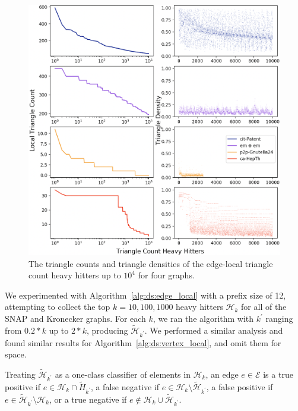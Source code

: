 \documentclass{vldb}
\begin{document}
\begin{figure}[t]
\centering
\includegraphics[width=0.9\columnwidth]{hh_comp_4}
\caption{The triangle counts and triangle densities of the edge-local triangle count heavy hitters up to $10^4$ for four graphs.
}
\label{fig:hh_comp}
\end{figure}


We experimented with Algorithm~\ref{alg:ds:edge_local} with a prefix size of 12, attempting to collect the top $k = 10, 100, 1000$ heavy hitters $\mathcal{H}_k$ for all of the SNAP and Kronecker graphs.
For each $k$, we ran the algorithm with $k^\prime$ ranging from $0.2 * k$ up to $2 * k$, producing $\widetilde{\mathcal{H}}_{k^\prime}$.
We performed a similar analysis and found similar results for Algorithm~\ref{alg:ds:vertex_local}, and omit them for space.


Treating $\widetilde{\mathcal{H}}_{k^\prime}$ as a one-class classifier of elements in $\mathcal{H}_k$, an edge $e \in \mathcal{E}$ is a true positive if $e \in \mathcal{H}_{k} \cap \widetilde{H}_{k^\prime}$, a false negative if $e \in \mathcal{H}_{k} \setminus \widetilde{\mathcal{H}}_{k^\prime}$, a false positive if $e \in \widetilde{\mathcal{H}}_{k^\prime} \setminus \mathcal{H}_{k}$, or a true negative if $e \not\in \mathcal{H}_{k} \cup\widetilde{\mathcal{H}}_{k^\prime}$.
\end{document}
